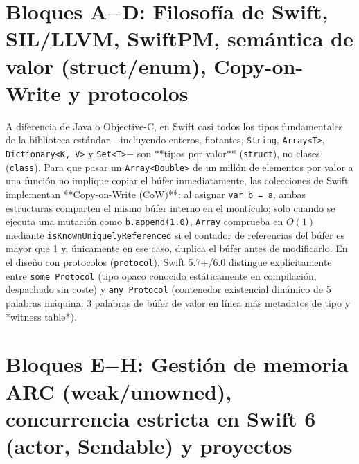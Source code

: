 \documentclass{book}
\begin{document}
\section{Bloques A\(-\)D: Filosofía de Swift, SIL/LLVM, SwiftPM, semántica de valor (struct/enum), Copy-on-Write y protocolos}

A diferencia de Java o Objective-C, en Swift casi todos los tipos fundamentales de la biblioteca estándar \(-\)incluyendo enteros, flotantes, \texttt{String}, \texttt{Array<T>}, \texttt{Dictionary<K, V>} y \texttt{Set<T>}\(-\) son **tipos por valor** (\texttt{struct}), no clases (\texttt{class}). Para que pasar un \texttt{Array<Double>} de un millón de elementos por valor a una función no implique copiar el búfer inmediatamente, las colecciones de Swift implementan **Copy-on-Write (CoW)**: al asignar \texttt{var b = a}, ambas estructuras comparten el mismo búfer interno en el montículo; solo cuando se ejecuta una mutación como \texttt{b.append(1.0)}, \texttt{Array} comprueba en \(O(1)\) mediante \texttt{isKnownUniquelyReferenced} si el contador de referencias del búfer es mayor que 1 y, únicamente en ese caso, duplica el búfer antes de modificarlo. En el diseño con protocolos (\texttt{protocol}), Swift 5.7+/6.0 distingue explícitamente entre \texttt{some Protocol} (tipo opaco conocido estáticamente en compilación, despachado sin coste) y \texttt{any Protocol} (contenedor existencial dinámico de 5 palabras máquina: 3 palabras de búfer de valor en línea más metadatos de tipo y *witness table*).

\section{Bloques E\(-\)H: Gestión de memoria ARC (weak/unowned), concurrencia estricta en Swift 6 (actor, Sendable) y proyectos}
\end{document}
